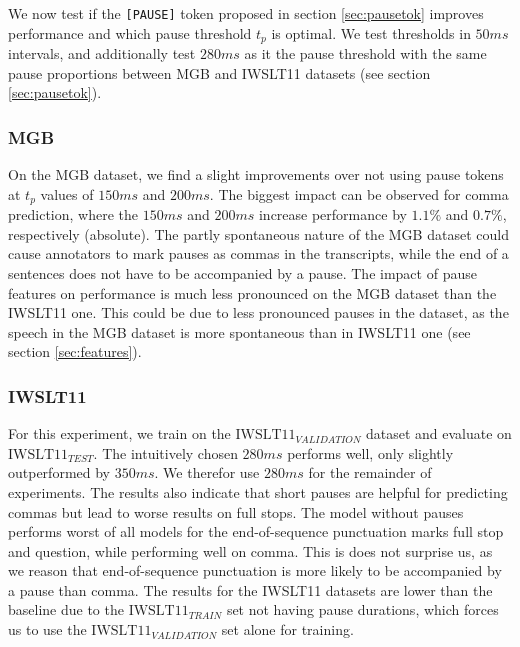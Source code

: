 \documentclass[bsc,deptreport,ai]{infthesis} %
\begin{document}
We now test if the \texttt{[PAUSE]} token proposed in section \ref{sec:pausetok} improves performance and which pause threshold $t_p$ is optimal. We test thresholds in $50ms$ intervals, and additionally test $280ms$ as it the pause threshold with the same pause proportions between MGB and IWSLT11 datasets (see section \ref{sec:pausetok}).
\subsubsection*{MGB}
On the MGB dataset, we find a slight improvements over not using pause tokens at $t_p$ values of $150ms$ and $200ms$. The biggest impact can be observed for comma prediction, where the $150ms$ and $200ms$ increase performance by $1.1\%$ and $0.7\%$, respectively (absolute). The partly spontaneous nature of the MGB dataset could cause annotators to mark pauses as commas in the transcripts, while the end of a sentences does not have to be accompanied by a pause. The impact of pause features on performance is much less pronounced on the MGB dataset than the IWSLT11 one. This could be due to less pronounced pauses in the dataset, as the speech in the MGB dataset is more spontaneous than in IWSLT11 one (see section \ref{sec:features}).
\subsubsection*{IWSLT11}
For this experiment, we train on the $\text{IWSLT11}_{VALIDATION}$ dataset and evaluate on $\text{IWSLT11}_{TEST}$. The intuitively chosen $280ms$ performs well, only slightly outperformed by $350ms$. We therefor use $280ms$ for the remainder of experiments. The results also indicate that short pauses are helpful for predicting commas but lead to worse results on full stops. The model without pauses performs worst of all models for the end-of-sequence punctuation marks full stop and question, while performing well on comma. This is does not surprise us, as we reason that end-of-sequence punctuation is more likely to be accompanied by a pause than comma. The results for the IWSLT11 datasets are lower than the baseline due to the $\text{IWSLT11}_{TRAIN}$ set not having pause durations, which forces us to use the $\text{IWSLT11}_{VALIDATION}$ set alone for training.
\end{document}
